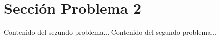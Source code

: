 \documentclass{IEEEcsmag}
\begin{document}
\newpage


\section{Sección Problema 2}
Contenido del segundo problema...
\newpage
Contenido del segundo problema...
\newpage
\end{document}
